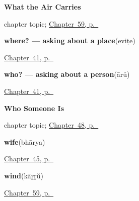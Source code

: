 \noindent\begin{minipage}[t]{\linewidth}
\raggedright
\textbf{What the Air Carries}\par
\footnotesize chapter topic; \hyperref[ch:ml-what-the-air-carries]{Chapter~59, p.~\pageref*{ch:ml-what-the-air-carries}}
\end{minipage}\par\smallskip

\noindent\begin{minipage}[t]{\linewidth}
\raggedright
\textbf{where? — asking about a place}\enspace\emph{}\enspace(eviṭe)\par
\footnotesize \hyperref[ch:ml-pointing-and-asking]{Chapter~41, p.~\pageref*{ch:ml-pointing-and-asking}}
\end{minipage}\par\smallskip

\noindent\begin{minipage}[t]{\linewidth}
\raggedright
\textbf{who? — asking about a person}\enspace\emph{}\enspace(ārŭ)\par
\footnotesize \hyperref[ch:ml-pointing-and-asking]{Chapter~41, p.~\pageref*{ch:ml-pointing-and-asking}}
\end{minipage}\par\smallskip

\noindent\begin{minipage}[t]{\linewidth}
\raggedright
\textbf{Who Someone Is}\par
\footnotesize chapter topic; \hyperref[ch:ml-roles]{Chapter~48, p.~\pageref*{ch:ml-roles}}
\end{minipage}\par\smallskip

\noindent\begin{minipage}[t]{\linewidth}
\raggedright
\textbf{wife}\enspace\emph{}\enspace(bhārya)\par
\footnotesize \hyperref[ch:ml-grandparents]{Chapter~45, p.~\pageref*{ch:ml-grandparents}}
\end{minipage}\par\smallskip

\noindent\begin{minipage}[t]{\linewidth}
\raggedright
\textbf{wind}\enspace\emph{}\enspace(kāṟṟŭ)\par
\footnotesize \hyperref[ch:ml-what-the-air-carries]{Chapter~59, p.~\pageref*{ch:ml-what-the-air-carries}}
\end{minipage}\par\smallskip

